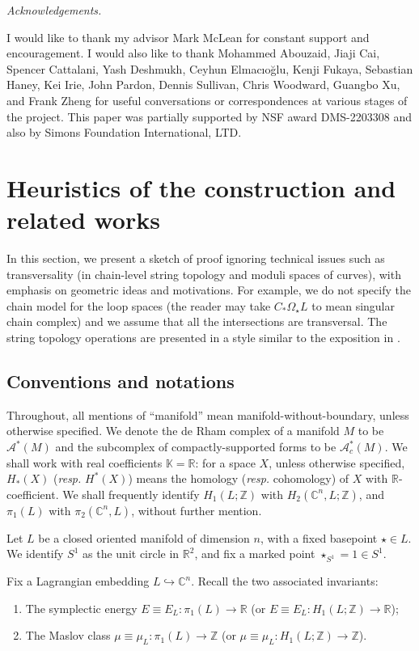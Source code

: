 \documentclass[10pt]{amsart}
\numberwithin{equation}{section}
\theoremstyle{plain}
\theoremstyle{definition}
\theoremstyle{remark}
\numberwithin{equation}{section}
\newcommand{\R}{\mathbb{R}}
\newcommand{\Z}{\mathbb{Z}}
\newcommand{\C}{\mathbb{C}}
\newcommand{\K}{\mathbb{K}}
\newcommand{\Acknowledgements}{{\em Acknowledgements.} }
\begin{document}
\bigskip


\Acknowledgements{I would like to thank my advisor Mark McLean for constant support and encouragement. I would also like to thank Mohammed Abouzaid, Jiaji Cai, Spencer Cattalani, Yash Deshmukh, Ceyhun Elmac{\i}o\u{g}lu, Kenji Fukaya, Sebastian Haney, Kei Irie, John Pardon, Dennis Sullivan, Chris Woodward, Guangbo Xu, and Frank Zheng for useful conversations or correspondences at various stages of the project.
This paper was partially supported by NSF award DMS-2203308 and also by Simons Foundation International, LTD.
\bigskip

\section{Heuristics of the  construction and related works}\label{Sec: SketchPf}

 In this section, we present a sketch of proof ignoring technical issues such as transversality (in chain-level string topology and moduli spaces of curves), with emphasis on geometric ideas and motivations. For example, we do not specify the chain model for the loop spaces (the reader may take $C_*\Omega_\star L$ to mean singular chain complex) and we assume that all the intersections are transversal. The string topology operations are presented in a style similar to the exposition in \cite{ChasSullivan}.


\subsection{Conventions and notations}
Throughout, all mentions of ``manifold'' mean manifold-without-boundary, unless otherwise specified.
We denote the de Rham complex of a manifold $M$ to be $\mathscr{A}^*(M)$ and the subcomplex of compactly-supported forms to be $\mathscr{A}^*_c(M)$.
We shall work with real coefficients $\K=\R$: for a space $X$, unless otherwise specified, $H_*(X)$ (\emph{resp.} $H^*(X)$) means the homology (\emph{resp.} cohomology) of $X$ with $\R$-coefficient.
We shall frequently identify $H_1(L;\Z)$ with $H_2(\C^n,L;\Z)$, and $\pi_1(L)$ with $\pi_2(\C^n,L)$, without further mention.


Let $L$ be a closed oriented manifold of dimension $n$, with a fixed basepoint $\star \in L$.  
We identify $S^1$ as the unit circle in $\R^2$, and fix a marked point $\star_{S^1}=1\in S^1$.

Fix a Lagrangian embedding $L\hookrightarrow \C^n$. Recall the two associated invariants:
\begin{enumerate}
	\item The symplectic energy $E\equiv E_L\colon \pi_1(L)\to \R$ (or $E\equiv E_L\colon H_1(L;\Z)\to \R$);
	\item The Maslov class $\mu\equiv \mu_L\colon \pi_1(L)\to \Z$ (or $\mu\equiv \mu_L\colon H_1(L;\Z)\to \Z$).
\end{enumerate}



}
\end{document}
